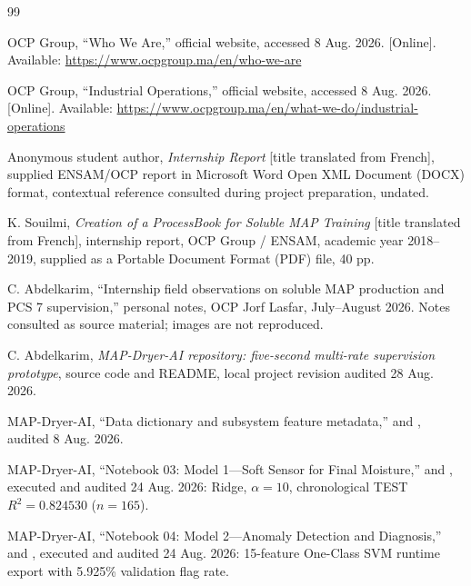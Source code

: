 \clearpage
\begingroup
\footnotesize
\setlength{\itemsep}{2.5pt}
\setlength{\parsep}{0pt}
\setlength{\parskip}{0pt}
\begin{thebibliography}{99}

 OCP Group, ``Who We Are,'' official website, accessed 8 Aug. 2026. [Online]. Available: \url{https://www.ocpgroup.ma/en/who-we-are}

 OCP Group, ``Industrial Operations,'' official website, accessed 8 Aug. 2026. [Online]. Available: \url{https://www.ocpgroup.ma/en/what-we-do/industrial-operations}

 Anonymous student author, \emph{Internship Report} [title translated from French], supplied ENSAM/OCP report in Microsoft Word Open XML Document (DOCX) format, contextual reference consulted during project preparation, undated.

 K. Souilmi, \emph{Creation of a ProcessBook for Soluble MAP Training} [title translated from French], internship report, OCP Group / ENSAM, academic year 2018--2019, supplied as a Portable Document Format (PDF) file, 40 pp.

 C. Abdelkarim, ``Internship field observations on soluble MAP production and PCS 7 supervision,'' personal notes, OCP Jorf Lasfar, July--August 2026. Notes consulted as source material; images are not reproduced.

 C. Abdelkarim, \emph{MAP-Dryer-AI repository: five-second multi-rate supervision prototype}, source code and README, local project revision audited 28 Aug. 2026.

 MAP-Dryer-AI, ``Data dictionary and subsystem feature metadata,''  and , audited 8 Aug. 2026.

 MAP-Dryer-AI, ``Notebook 03: Model 1---Soft Sensor for Final Moisture,''  and , executed and audited 24 Aug. 2026: Ridge, $\alpha=10$, chronological TEST $R^2=0.824530$ ($n=165$).

 MAP-Dryer-AI, ``Notebook 04: Model 2---Anomaly Detection and Diagnosis,''  and , executed and audited 24 Aug. 2026: 15-feature One-Class SVM runtime export with 5.925\% validation flag rate.


\end{thebibliography}
